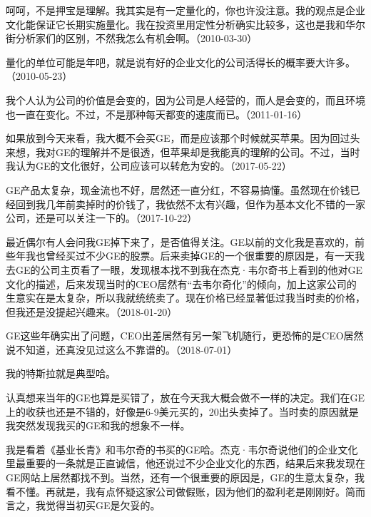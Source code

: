 呵呵，不是押宝是理解。我其实是有一定量化的，你也许没注意。我的观点是企业文化能保证它长期实施量化。我在投资里用定性分析确实比较多，这也是我和华尔街分析家们的区别，不然我怎么有机会啊。（2010-03-30）


量化的单位可能是年吧，就是说有好的企业文化的公司活得长的概率要大许多。（2010-05-23）


我个人认为公司的价值是会变的，因为公司是人经营的，而人是会变的，而且环境也一直在变化。不过，不是那种每天都变的速度而已。（2011-01-16）


如果放到今天来看，我大概不会买GE，而是应该那个时候就买苹果。因为回过头来想，我对GE的理解并不是很透，但苹果却是我能真的理解的公司。不过，当时我认为GE的文化很好，公司应该可以转危为安的。（2017-05-22）


GE产品太复杂，现金流也不好，居然还一直分红，不容易搞懂。虽然现在价钱已经回到我几年前卖掉时的价钱了，我依然不太有兴趣，但作为基本文化不错的一家公司，还是可以关注一下的。（2017-10-22）

最近偶尔有人会问我GE掉下来了，是否值得关注。GE以前的文化我是喜欢的，前些年我也曾经买过不少GE的股票。后来卖掉GE的一个很重要的原因是，有一天我去GE的公司主页看了一眼，发现根本找不到我在杰克·韦尔奇书上看到的他对GE文化的描述，后来发现当时的CEO居然有“去韦尔奇化”的倾向，加上这家公司的生意实在是太复杂，所以我就统统卖了。现在价格已经显著低过我当时卖的价格，但我还是没提起兴趣来。（2018-01-20）


GE这些年确实出了问题，CEO出差居然有另一架飞机随行，更恐怖的是CEO居然说不知道，还真没见过这么不靠谱的。（2018-07-01）


我的特斯拉就是典型哈。

认真想来当年的GE也算是买错了，放在今天我大概会做不一样的决定。我们在GE上的收获也还是不错的，好像是6-9美元买的，20出头卖掉了。当时卖的原因就是我突然发现我买的GE和我的想象不一样。


我是看着《基业长青》和韦尔奇的书买的GE哈。杰克·韦尔奇说他们的企业文化里最重要的一条就是正直诚信，他还说过不少企业文化的东西，结果后来我发现在GE网站上居然都找不到。当然，还有一个很重要的原因是，GE的生意太复杂，我看不懂。再就是，我有点怀疑这家公司做假账，因为他们的盈利老是刚刚好。简而言之，我觉得当初买GE是欠妥的。

